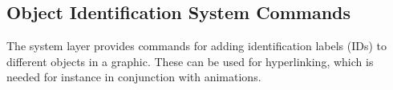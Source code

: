 

















\subsection{Object Identification System Commands}
\label{section-sys-id}

The system layer provides commands for adding identification labels
(IDs) to different objects in a graphic. These can be used for
hyperlinking, which is needed for instance in conjunction with
animations.

